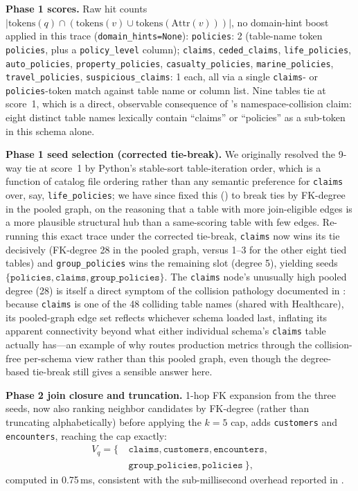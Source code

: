 \documentclass[twocolumn]{svjour3}
\begin{document}
\textbf{Phase 1 scores.} Raw hit counts $|\text{tokens}(q) \cap (\text{tokens}(v) \cup \text{tokens}(\text{Attr}(v)))|$, no domain-hint boost applied in this trace (\texttt{domain\_hints=None}):
\texttt{policies}: 2 (table-name token \texttt{policies}, plus a \texttt{policy\_level} column); \texttt{claims}, \texttt{ceded\_claims}, \texttt{life\_policies}, \texttt{auto\_policies}, \texttt{property\_policies}, \texttt{casualty\_policies}, \texttt{marine\_policies}, \texttt{travel\_policies}, \texttt{suspicious\_claims}: 1 each, all via a single \texttt{claims}- or \texttt{policies}-token match against table name or column list.
Nine tables tie at score~1, which is a direct, observable consequence of 's namespace-collision claim: eight distinct table names lexically contain ``claims'' or ``policies'' as a sub-token in this schema alone.

\textbf{Phase 1 seed selection (corrected tie-break).} We originally resolved the 9-way tie at score~1 by Python's stable-sort table-iteration order, which is a function of catalog file ordering rather than any semantic preference for \texttt{claims} over, say, \texttt{life\_policies}; we have since fixed this () to break ties by FK-degree in the pooled graph, on the reasoning that a table with more join-eligible edges is a more plausible structural hub than a same-scoring table with few edges.
Re-running this exact trace under the corrected tie-break, \texttt{claims} now wins its tie decisively (FK-degree 28 in the pooled graph, versus 1--3 for the other eight tied tables) and \texttt{group\_policies} wins the remaining slot (degree 5), yielding seeds $\{\texttt{policies}, \texttt{claims}, \texttt{group\_policies}\}$.
The \texttt{claims} node's unusually high pooled degree (28) is itself a direct symptom of the collision pathology documented in : because \texttt{claims} is one of the 48 colliding table names (shared with Healthcare), its pooled-graph edge set reflects whichever schema loaded last, inflating its apparent connectivity beyond what either individual schema's \texttt{claims} table actually has---an example of why  routes production metrics through the collision-free per-schema view rather than this pooled graph, even though the degree-based tie-break still gives a sensible answer here.

\textbf{Phase 2 join closure and truncation.} 1-hop FK expansion from the three seeds, now also ranking neighbor candidates by FK-degree (rather than truncating alphabetically) before applying the $k{=}5$ cap, adds \texttt{customers} and \texttt{encounters}, reaching the cap exactly:
{\small
\begin{align*}
V_q = \{\ & \texttt{claims}, \texttt{customers}, \texttt{encounters}, \\
          & \texttt{group\_policies}, \texttt{policies}\ \},
\end{align*}
}
computed in 0.75\,ms, consistent with the sub-millisecond overhead reported in .
\end{document}

